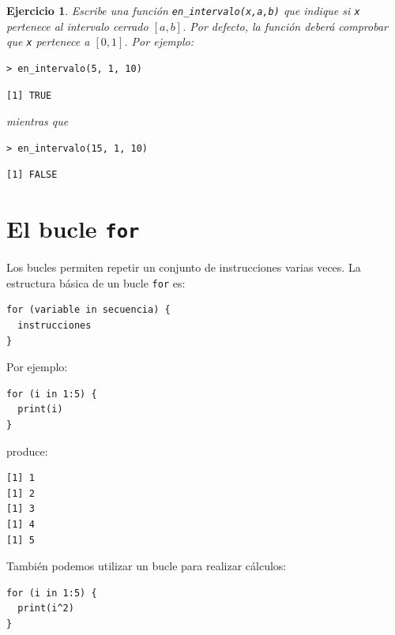 \documentclass[11pt,a4paper]{article}
\theoremstyle{exercise}
\newtheorem{exercise}{Ejercicio}
\begin{document}
\begin{exercise}
Escribe una función \texttt{en\_intervalo(x,a,b)} que indique si \texttt{x} pertenece al intervalo cerrado $[a,b]$. Por defecto, la función deberá comprobar que \texttt{x} pertenece a $[0,1]$. Por ejemplo:

\begin{lstlisting}[style=rconsole]
> en_intervalo(5, 1, 10)
\end{lstlisting}

\begin{lstlisting}[style=routput]
[1] TRUE
\end{lstlisting}

\noindent mientras que

\begin{lstlisting}[style=rconsole]
> en_intervalo(15, 1, 10)
\end{lstlisting}

\begin{lstlisting}[style=routput]
[1] FALSE
\end{lstlisting}
\end{exercise}

\section{El bucle \texttt{for}}

Los bucles permiten repetir un conjunto de instrucciones varias veces. La estructura básica de un bucle \texttt{for} es:

\begin{lstlisting}[style=rstyle]
for (variable in secuencia) {
  instrucciones
}
\end{lstlisting}

\noindent Por ejemplo:

\begin{lstlisting}[style=rstyle]
for (i in 1:5) {
  print(i)
}
\end{lstlisting}

\noindent produce:

\begin{lstlisting}[style=routput]
[1] 1
[1] 2
[1] 3
[1] 4
[1] 5
\end{lstlisting}

\noindent También podemos utilizar un bucle para realizar cálculos:

\begin{lstlisting}[style=rstyle]
for (i in 1:5) {
  print(i^2)
}
\end{lstlisting}
\end{document}
